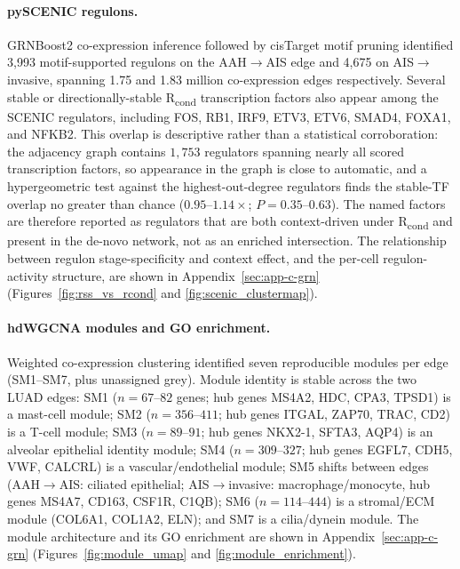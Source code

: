 \paragraph{pySCENIC regulons.} GRNBoost2 co-expression inference followed by cisTarget motif pruning identified 3,993 motif-supported regulons on the AAH$\rightarrow$AIS edge and 4,675 on AIS$\rightarrow$invasive, spanning 1.75 and 1.83 million co-expression edges respectively. Several stable or directionally-stable R\textsubscript{cond} transcription factors also appear among the SCENIC regulators, including FOS, RB1, IRF9, ETV3, ETV6, SMAD4, FOXA1, and NFKB2. This overlap is descriptive rather than a statistical corroboration: the adjacency graph contains $1{,}753$ regulators spanning nearly all scored transcription factors, so appearance in the graph is close to automatic, and a hypergeometric test against the highest-out-degree regulators finds the stable-TF overlap no greater than chance ($0.95$--$1.14\times$; $P = 0.35$--$0.63$). The named factors are therefore reported as regulators that are both context-driven under R\textsubscript{cond} and present in the de-novo network, not as an enriched intersection. The relationship between regulon stage-specificity and context effect, and the per-cell regulon-activity structure, are shown in Appendix~\ref{sec:app-c-grn} (Figures~\ref{fig:rss_vs_rcond} and \ref{fig:scenic_clustermap}).


\paragraph{hdWGCNA modules and GO enrichment.} Weighted co-expression clustering identified seven reproducible modules per edge (SM1--SM7, plus unassigned grey). Module identity is stable across the two LUAD edges: SM1 ($n=67$--$82$ genes; hub genes MS4A2, HDC, CPA3, TPSD1) is a mast-cell module; SM2 ($n=356$--$411$; hub genes ITGAL, ZAP70, TRAC, CD2) is a T-cell module; SM3 ($n=89$--$91$; hub genes NKX2-1, SFTA3, AQP4) is an alveolar epithelial identity module; SM4 ($n=309$--$327$; hub genes EGFL7, CDH5, VWF, CALCRL) is a vascular/endothelial module; SM5 shifts between edges (AAH$\rightarrow$AIS: ciliated epithelial; AIS$\rightarrow$invasive: macrophage/monocyte, hub genes MS4A7, CD163, CSF1R, C1QB); SM6 ($n=114$--$444$) is a stromal/ECM module (COL6A1, COL1A2, ELN); and SM7 is a cilia/dynein module. The module architecture and its GO enrichment are shown in Appendix~\ref{sec:app-c-grn} (Figures~\ref{fig:module_umap} and \ref{fig:module_enrichment}).


